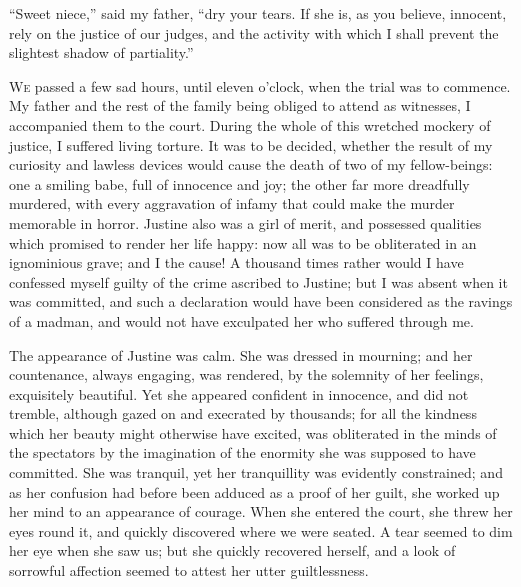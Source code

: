 ``Sweet niece,'' said my father,
``dry your tears. If she is, as you believe,
innocent, rely on the justice of
our judges, and the activity with which
I shall prevent the slightest shadow of
partiality.''


\textsc{We} passed a few sad hours, until
eleven o'clock, when the trial was to
commence. My father and the rest of
the family being obliged to attend as
witnesses, I accompanied them to the
court. During the whole of this
wretched mockery of justice, I suffered
living torture. It was to be decided,
whether the result of my curiosity and
lawless devices would cause the death
of two of my fellow-beings: one a
smiling babe, full of innocence and
joy; the other far more dreadfully murdered,
with every aggravation of infamy
that could make the murder memorable
in horror. Justine also was a
girl of merit, and possessed qualities
which promised to render her life
happy: now all was to be obliterated
in an ignominious grave; and I the
cause! A thousand times rather would
I have confessed myself guilty of the
crime ascribed to Justine; but I was
absent when it was committed, and such
a declaration would have been considered
as the ravings of a madman, and
would not have exculpated her who
suffered through me.

The appearance of Justine was calm.
She was dressed in mourning; and her
countenance, always engaging, was
rendered, by the solemnity of her feelings,
exquisitely beautiful. Yet she
appeared confident in innocence, and
did not tremble, although gazed on and
execrated by thousands; for all the
kindness which her beauty might otherwise
have excited, was obliterated in
the minds of the spectators by the imagination
of the enormity she was supposed
to have committed. She was
tranquil, yet her tranquillity was evidently
constrained; and as her confusion
had before been adduced as a
proof of her guilt, she worked up her
mind to an appearance of courage.
When she entered the court, she threw
her eyes round it, and quickly discovered
where we were seated. A tear
seemed to dim her eye when she saw
us; but she quickly recovered herself,
and a look of sorrowful affection seemed
to attest her utter guiltlessness.

